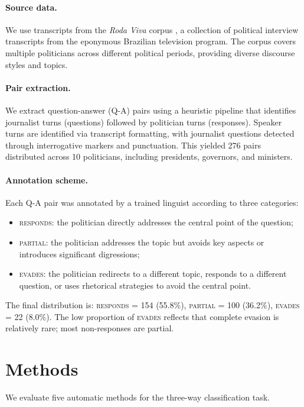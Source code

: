\documentclass[11pt]{article}
\begin{document}
\paragraph{Source data.}
We use transcripts from the \textit{Roda Viva} corpus \cite{rodaviva2023}, a collection of political interview transcripts from the eponymous Brazilian television program. The corpus covers multiple politicians across different political periods, providing diverse discourse styles and topics.

\paragraph{Pair extraction.}
We extract question-answer (Q-A) pairs using a heuristic pipeline that identifies journalist turns (questions) followed by politician turns (responses). Speaker turns are identified via transcript formatting, with journalist questions detected through interrogative markers and punctuation. This yielded 276 pairs distributed across 10 politicians, including presidents, governors, and ministers.

\paragraph{Annotation scheme.}
Each Q-A pair was annotated by a trained linguist according to three categories:
\begin{itemize}
  \item \textsc{responds}: the politician directly addresses the central point of the question;
  \item \textsc{partial}: the politician addresses the topic but avoids key aspects or introduces significant digressions;
  \item \textsc{evades}: the politician redirects to a different topic, responds to a different question, or uses rhetorical strategies to avoid the central point.
\end{itemize}

The final distribution is: \textsc{responds} = 154 (55.8\%), \textsc{partial} = 100 (36.2\%), \textsc{evades} = 22 (8.0\%). The low proportion of \textsc{evades} reflects that complete evasion is relatively rare; most non-responses are partial.

\section{Methods}

We evaluate five automatic methods for the three-way classification task.
\end{document}
